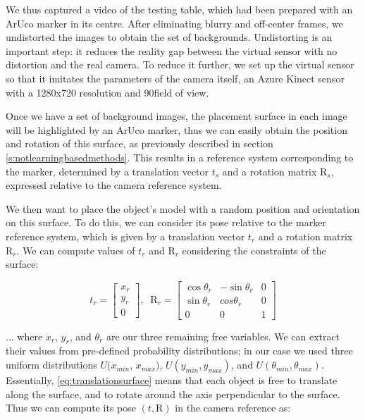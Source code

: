 We thus captured a video of the testing table, which had been prepared with an ArUco marker in its centre. After eliminating blurry and off-center frames, we undistorted the images to obtain the set of backgrounds. Undistorting is an important step: it reduces the reality gap between the virtual sensor with no distortion and the real camera. To reduce it further, we set up the virtual sensor so that it imitates the parameters of the camera itself, an Azure Kinect sensor with a 1280x720 resolution and 90\degree field of view.

Once we have a set of background images, the placement surface in each image will be highlighted by an ArUco marker, thus we can easily obtain the position and rotation of this surface, as previously described in section \ref*{s:notlearningbasedmethods}. This results in a reference system corresponding to the marker, determined by a translation vector $t_s$ and a rotation matrix $\text{R}_s$, expressed relative to the camera reference system.

We then want to place the object's model with a random position and orientation on this surface. To do this, we can consider its pose relative to the marker reference system, which is given by a translation vector $t_r$ and a rotation matrix $\text{R}_r$. We can compute values of $t_r$ and $\text{R}_r$ considering the constraints of the surface:

\begin{equation}
    t_r = 
    \begin{bmatrix}
        x_r\\y_r\\0
    \end{bmatrix}
    ,\; \; \text{R}_r =
    \begin{bmatrix}
        \cos \theta_r & - \sin \theta_r & 0 \\
        \sin \theta_r & cos \theta_r & 0 \\
        0 & 0 & 1
    \end{bmatrix}
    \label{eq:translationsurface}
\end{equation}

... where $x_r$, $y_r$, and  $\theta_r$ are our three remaining free variables. We can extract their values from pre-defined probability distributions; in our case we used three uniform distributions $U(x_{min}$, $x_{max})$, $U(y_{min}, y_{max})$, and $U(\theta_{min}, \theta_{max})$. Essentially, \ref{eq:translationsurface} means that each object is free to translate along the surface, and to rotate around the axis perpendicular to the surface. Thus we can compute its pose $(t, \text{R})$ in the camera reference as:

